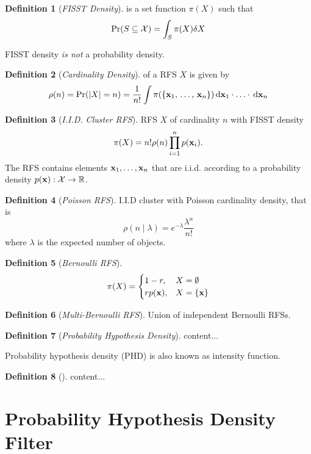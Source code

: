 \documentclass[a4paper,10pt]{scrreprt}
\theoremstyle{theorem}
\theoremstyle{definition}
\newtheorem{defn}{Definition}
\begin{document}
\begin{defn}[\emph{FISST Density}]
	 is a set function \( \pi(X) \) such that 
	\begin{equation}\label{eq:fiist_density}
		\Pr(S \subseteq \mathcal{X}) = \int_S \pi(X) \dsx[X]
	\end{equation}
\end{defn}
FISST density \emph{is not} a probability density.

\begin{defn}[\emph{Cardinality Density}]
	of a RFS \( X \) is given by
	\begin{equation}\label{key}
		\rho(n) = \Pr(|X|=n) = \frac{1}{n!}\int \pi(\Bqty{\stVar_1,\, \ldots,\, \stVar_n}) \dx[\stVar_1]\cdot\ldots\cdot\dx[\stVar_n]
	\end{equation}
\end{defn}

\begin{defn}[\emph{I.I.D. Cluster RFS}]
	RFS \( X \) of cardinality \( n \) with FISST density
	\begin{equation}\label{key}
		\pi(X) = n! \rho(n) \prod_{i=1}^{n} p(\stVar_i).
	\end{equation}
	The RFS contains elements \( \stVar_1, \ldots, \stVar_n \) that are i.i.d. according to a probability density \( p(\stVar): \stSp\to\R \).
\end{defn}

\begin{defn}[\emph{Poisson RFS}]
	I.I.D cluster with Poisson cardinality density, that is
	\begin{equation}\label{key}
		\rho(n \mid \lambda) = e^{-\lambda} \frac{\lambda^n}{n!}
	\end{equation}
	where \( \lambda \) is the expected number of objects.
\end{defn}

\begin{defn}[\emph{Bernoulli RFS}]
\begin{equation}\label{eq:bernoulli_rfs}
	\pi(X) = 
	\begin{cases}
	1 - r, 			& X = \emptyset \\
	r p(\stVar), 	& X = \Bqty{\stVar}
	\end{cases}
\end{equation}
\end{defn}

\begin{defn}[\emph{Multi-Bernoulli RFS}]
	Union of independent Bernoulli RFSs.
\end{defn}

\begin{defn}[\emph{Probability Hypothesis Density}]
	content...
\end{defn}
Probability hypothesis density (PHD) is also known as intensity function.

\begin{defn}[]
	content...
\end{defn}



\section{Probability Hypothesis Density Filter}





\end{document}
